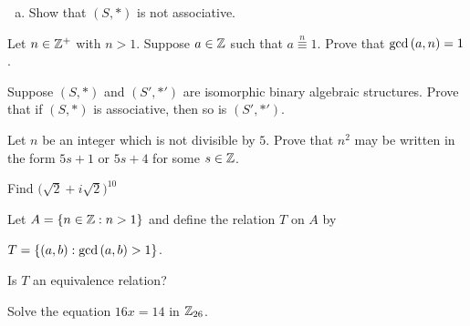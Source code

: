 \documentclass[11pt]{exam}
\begin{document}
\begin{questions}
\begin{enumerate}[(a)]
\item Show that $(S,*)$ is not associative.
\vspace{5cm}
\end{enumerate}
\newpage

\question[3] Let $n\in\mathbb{Z}^{+}$ with $n > 1$.  Suppose $a\in\mathbb{Z}$ such that $a\overset{n}{\equiv} 1$.  Prove that $\text{gcd}\left(a,n\right) = 1$.
\vfill

\question[3] Suppose $(S,*)$ and $(S',*')$ are isomorphic binary algebraic structures.  Prove that if $(S,*)$ is associative, then so is $(S',*')$.
\vfill
\newpage

\question[4] Let $n$ be an integer which is not divisible by $5$.  Prove that $n^2$ may be written in the form $5s+1$ or $5s + 4$ for some $s\in\mathbb{Z}$.
\vfill

\question[3] Find $\big(\sqrt{2} + i\sqrt{2}\big)^{10}$
\vfill

\newpage

\question[3] Let $A = \left\{n\in\mathbb{Z} : n > 1\right\}$ and define the relation $T$ on $A$ by
\begin{center}
$T = \left\{(a,b):\text{gcd}\left(a,b\right) > 1\right\}$.
\end{center}
Is $T$ an equivalence relation?
\vfill

\question[4] Solve the equation $16x = 14$ in $\mathbb{Z}_{26}$.
\vfill

\end{questions}
\end{document}
